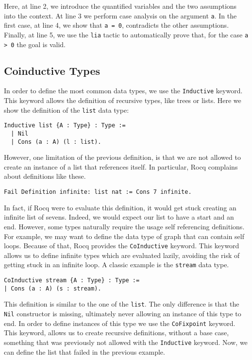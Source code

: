 Here, at line 2, we introduce the quantified variables and the two assumptions into the context. At line 3 we perform case analysis on the argument \texttt a. In the first case, at line 4, we show that \texttt{a = 0}, contradicts the other assumptions. Finally, at line 5, we use the \texttt{lia} tactic to automatically prove that, for the case \texttt{a > 0} the goal is valid.

\subsection{Coinductive Types}
\label{subsec:coind}

In order to define the most common data types, we use the \texttt{Inductive} keyword. This keyword allows the definition of recursive types, like trees or lists. Here we show the definition of the \texttt{list} data type:

\begin{lstlisting}[style=Rocq]
Inductive list {A : Type} : Type :=
  | Nil
  | Cons (a : A) (l : list).
\end{lstlisting}

However, one limitation of the previous definition, is that we are not allowed to create an instance of a list that references itself. In particular, Rocq complains about definitions like these.

\begin{lstlisting}[style=Rocq]
Fail Definition infinite: list nat := Cons 7 infinite.
\end{lstlisting}

In fact, if Rocq were to evaluate this definition, it would get stuck creating an infinite list of sevens. Indeed, we would expect our list to have a start and an end.
However, some types naturally require the usage self referencing definitions. For example, we may want to define the data type of graph that can contain self loops. Because of that, Rocq provides the \texttt{CoInductive} keyword. This keyword allows us to define infinite types which are evaluated lazily, avoiding the risk of getting stuck in an infinite loop. A classic example is the \texttt{stream} data type.

\begin{lstlisting}[style=Rocq]
CoInductive stream {A : Type} : Type :=
| Cons (a : A) (s : stream).
\end{lstlisting}

This definition is similar to the one of the \texttt{list}. The only difference is that the \texttt{Nil} constructor is missing, ultimately never allowing an instance of this type to end. In order to define instances of this type we use the \texttt{CoFixpoint} keyword. This keyword, allows us to create recursive definitions, without a base case, something that was previously not allowed with the \texttt{Inductive} keyword. Now, we can define the list that failed in the previous example.

